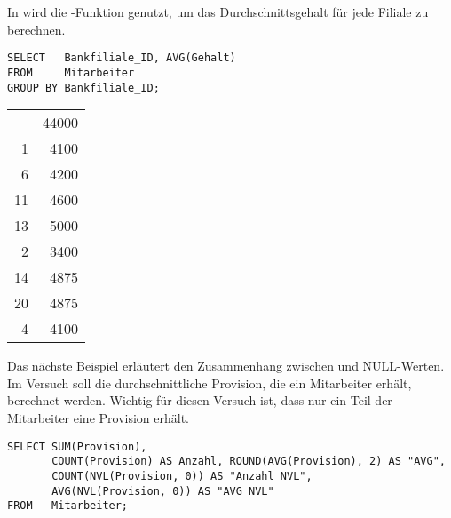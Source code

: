         In  wird die -Funktion genutzt, um das Durchschnittsgehalt für jede Filiale zu berechnen.
        \begin{lstlisting}[language=oracle_sql,caption={Die AVG-Funktion},label=sql05_08]
SELECT   Bankfiliale_ID, AVG(Gehalt)
FROM     Mitarbeiter
GROUP BY Bankfiliale_ID;
        \end{lstlisting}
\clearpage
        \begin{center}
          \begin{small}
            \tablehead{}
            \begin{msoraclesql}
              \begin{supertabular}{rr}
                & 44000 \\
                1 & 4100 \\
                6 & 4200 \\
                11 & 4600 \\
                13 & 5000 \\
                2 & 3400 \\
                14 & 4875 \\
                20 & 4875 \\
                4 & 4100 \\
              \end{supertabular}
            \end{msoraclesql}
          \end{small}
        \end{center}
        Das nächste Beispiel erläutert den Zusammenhang zwischen  und NULL-Werten. Im Versuch soll die durchschnittliche Provision, die ein Mitarbeiter erhält, berechnet werden. Wichtig für diesen Versuch ist, dass nur ein Teil der Mitarbeiter eine Provision erhält.
        \begin{lstlisting}[language=oracle_sql,caption={AVG und NULL-Werte in Oracle},label=sql05_09]
SELECT SUM(Provision),
       COUNT(Provision) AS Anzahl, ROUND(AVG(Provision), 2) AS "AVG",
       COUNT(NVL(Provision, 0)) AS "Anzahl NVL",
       AVG(NVL(Provision, 0)) AS "AVG NVL"
FROM   Mitarbeiter;
        \end{lstlisting}
